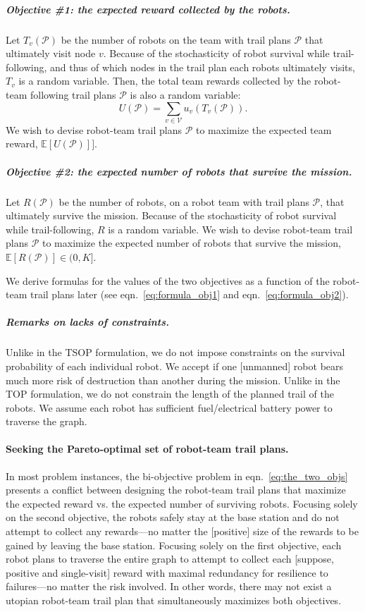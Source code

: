 \documentclass[11pt, oneside]{article}
\begin{document}
\vspace{-\baselineskip}
\subparagraph{Objective \#1: the expected reward collected by the robots.}
Let $T_v(\mathcal{P}) $ be the number of robots on the team with trail plans $\mathcal{P}$ that ultimately visit node $v$.
Because of the stochasticity of robot survival while trail-following, and thus of which nodes in the trail plan each robots ultimately visits, $T_v$ is a random variable.
Then, the total team rewards collected by the robot-team following trail plans $\mathcal{P}$ is also a random variable:
\begin{equation}
U(\mathcal{P}) = \sum_{v\in\mathcal{V}} u_v\left ( T_v(\mathcal{P}) \right).
\end{equation}
We wish to devise robot-team trail plans $\mathcal{P}$ to maximize the expected team reward, $\mathbb{E}[U(\mathcal{P})]]$.

\vspace{-\baselineskip}
\subparagraph{Objective \#2: the expected number of robots that survive the mission.}
Let $R(\mathcal{P})$ be the number of robots, on a robot team with trail plans $\mathcal{P}$, that ultimately survive the mission. Because of the stochasticity of robot survival while trail-following, $R$ is a random variable. We wish to devise robot-team trail plans $\mathcal{P}$ to maximize the expected number of robots that survive the mission, $\mathbb{E}[R(\mathcal{P})] \in (0, K]$.

We derive formulas for the values of the two objectives as a function of the robot-team trail plans later (see eqn.~\ref{eq:formula_obj1} and eqn.~\ref{eq:formula_obj2}). 

\subparagraph{Remarks on lacks of constraints.} 
Unlike in the TSOP formulation, we do not impose constraints on the survival probability of each individual robot. We accept if one [unmanned] robot bears much more risk of destruction than another during the mission. 
Unlike in the TOP formulation, we do not constrain the length of the planned trail of the robots. We assume each robot has sufficient fuel/electrical battery power to traverse the graph.


\paragraph{Seeking the Pareto-optimal set of robot-team trail plans.} 
In most problem instances, the bi-objective problem in eqn.~\ref{eq:the_two_objs} presents a conflict between designing the robot-team trail plans that maximize the expected reward vs. the expected number of surviving robots. 
Focusing solely on the second objective, the robots safely stay at the base station and do not attempt to collect any rewards---no matter the [positive] size of the rewards to be gained by leaving the base station. 
Focusing solely on the first objective, each robot plans to traverse the entire graph to attempt to collect each [suppose, positive and single-visit] reward with maximal redundancy for resilience to failures---no matter the risk involved.
In other words, there may not exist a utopian robot-team trail plan that simultaneously maximizes both objectives. 
\end{document}

